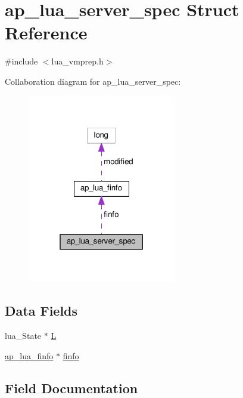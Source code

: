 \hypertarget{structap__lua__server__spec}{}\section{ap\+\_\+lua\+\_\+server\+\_\+spec Struct Reference}
\label{structap__lua__server__spec}


{\ttfamily \#include $<$lua\+\_\+vmprep.\+h$>$}



Collaboration diagram for ap\+\_\+lua\+\_\+server\+\_\+spec\+:
\nopagebreak
\begin{figure}[H]
\begin{center}
\leavevmode
\includegraphics[width=184pt]{structap__lua__server__spec__coll__graph}
\end{center}
\end{figure}
\subsection*{Data Fields}
\begin{DoxyCompactItemize}
\item 
lua\+\_\+\+State $\ast$ \hyperlink{structap__lua__server__spec_aa154aeca7d8846f6093639b6e94075e6}{L}
\item 
\hyperlink{structap__lua__finfo}{ap\+\_\+lua\+\_\+finfo} $\ast$ \hyperlink{structap__lua__server__spec_a119c899d97887709311ec325875662ca}{finfo}
\end{DoxyCompactItemize}


\subsection{Field Documentation}
